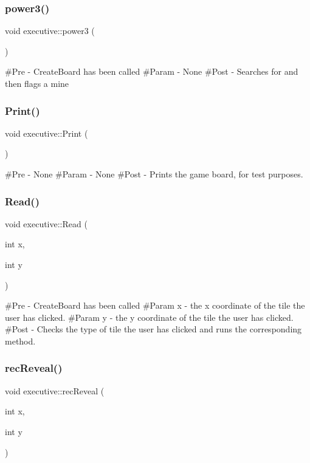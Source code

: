 \subsubsection{\texorpdfstring{power3()}{power3()}}
{\footnotesize\ttfamily void executive\+::power3 (\begin{DoxyParamCaption}{ }\end{DoxyParamCaption})}

\#\+Pre -\/ Create\+Board has been called \#\+Param -\/ None \#\+Post -\/ Searches for and then flags a mine \mbox{\label{classexecutive_ae5e04159c4d86678485e4d788f302732}} 
\subsubsection{\texorpdfstring{Print()}{Print()}}
{\footnotesize\ttfamily void executive\+::\+Print (\begin{DoxyParamCaption}{ }\end{DoxyParamCaption})}

\#\+Pre -\/ None \#\+Param -\/ None \#\+Post -\/ Prints the game board, for test purposes. \mbox{\label{classexecutive_ab92cac9cdd28c568d079653c516c6a35}} 
\subsubsection{\texorpdfstring{Read()}{Read()}}
{\footnotesize\ttfamily void executive\+::\+Read (\begin{DoxyParamCaption}\item[{int}]{x,  }\item[{int}]{y }\end{DoxyParamCaption})}

\#\+Pre -\/ Create\+Board has been called \#\+Param x -\/ the x coordinate of the tile the user has clicked. \#\+Param y -\/ the y coordinate of the tile the user has clicked. \#\+Post -\/ Checks the type of tile the user has clicked and runs the corresponding method. \mbox{\label{classexecutive_ad2c46b69f5f3592067d26e3dd7280616}} 
\subsubsection{\texorpdfstring{recReveal()}{recReveal()}}
{\footnotesize\ttfamily void executive\+::rec\+Reveal (\begin{DoxyParamCaption}\item[{int}]{x,  }\item[{int}]{y }\end{DoxyParamCaption})}


